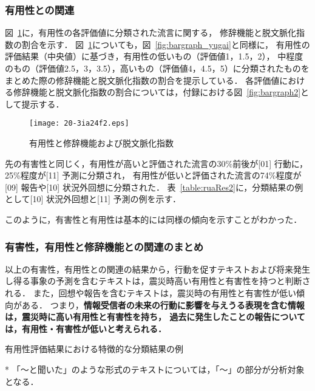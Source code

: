 \documentclass[japanese]{jnlp_1.4}
\begin{document}
\subsubsection*{有用性との関連}

図~\ref{fig:bargraph_yuyou}に，有用性の各評価値に分類された流言に関する，
修辞機能と脱文脈化指数の割合を示す．
図~\ref{fig:bargraph_yuyou}についても，図~\ref{fig:bargraph_yugai}と同様に，
有用性の評価結果（中央値）に基づき，有用性の低いもの（評価値1，1.5，2），
中程度のもの（評価値2.5，3，3.5），高いもの（評価値4，4.5，5）に分類されたものをまとめた際の修辞機能と脱文脈化指数の割合を提示している．
各評価値における修辞機能と脱文脈化指数の割合については，付録における図~\ref{fig:bargraph2}として提示する．

\begin{figure}[b]
\begin{center}
\texttt{[image: 20-3ia24f2.eps]}
\end{center}
\caption{有用性と修辞機能および脱文脈化指数}
\label{fig:bargraph_yuyou}
\end{figure}

先の有害性と同じく，有用性が高いと評価された流言の30\%前後が[01] 行動に，25\%程度が[11] 予測に分類され，
有用性が低いと評価された流言の74\%程度が[09] 報告や[10] 状況外回想に分類された．
表~\ref{table:ruaRes2}に，分類結果の例として[10] 状況外回想と[11] 予測の例を示す．

このように，有害性と有用性は基本的には同様の傾向を示すことがわかった．


\subsubsection*{有害性，有用性と修辞機能との関連のまとめ}

以上の有害性，有用性との関連の結果から，行動を促すテキストおよび将来発生し得る事象の予測を含むテキストは，震災時高い有用性と有害性を持つと判断される．
また，回想や報告を含むテキストは，震災時の有用性と有害性が低い傾向がある．
つまり，{\bf 情報受信者の未来の行動に影響を与えうる表現を含む情報は，震災時に高い有用性と有害性を持ち，
過去に発生したことの報告については，有用性・有害性が低いと考えられる．}

\begin{table}[t]
\caption{有用性評価結果における特徴的な分類結果の例}
\label{table:ruaRes2}

\vspace{0.5zw}\small
* 「〜と聞いた」のような形式のテキストについては，「〜」の部分が分析対象となる．\par
\end{table}
\end{document}
